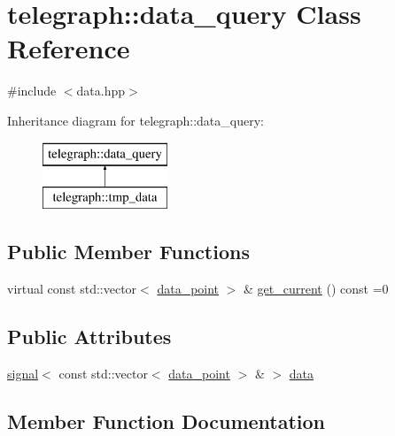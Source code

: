 \hypertarget{classtelegraph_1_1data__query}{}\section{telegraph\+:\+:data\+\_\+query Class Reference}
\label{classtelegraph_1_1data__query}


{\ttfamily \#include $<$data.\+hpp$>$}

Inheritance diagram for telegraph\+:\+:data\+\_\+query\+:\begin{figure}[H]
\begin{center}
\leavevmode
\includegraphics[height=2.000000cm]{classtelegraph_1_1data__query}
\end{center}
\end{figure}
\subsection*{Public Member Functions}
\begin{DoxyCompactItemize}
\item 
virtual const std\+::vector$<$ \hyperlink{classtelegraph_1_1data__point}{data\+\_\+point} $>$ \& \hyperlink{classtelegraph_1_1data__query_a20545e27166e025df2f73c13907bf721}{get\+\_\+current} () const =0
\end{DoxyCompactItemize}
\subsection*{Public Attributes}
\begin{DoxyCompactItemize}
\item 
\hyperlink{classtelegraph_1_1signal}{signal}$<$ const std\+::vector$<$ \hyperlink{classtelegraph_1_1data__point}{data\+\_\+point} $>$ \& $>$ \hyperlink{classtelegraph_1_1data__query_a81705835f67a1e5a4ce2c1009847eddc}{data}
\end{DoxyCompactItemize}


\subsection{Member Function Documentation}
\mbox{\label{classtelegraph_1_1data__query_a20545e27166e025df2f73c13907bf721}} 
